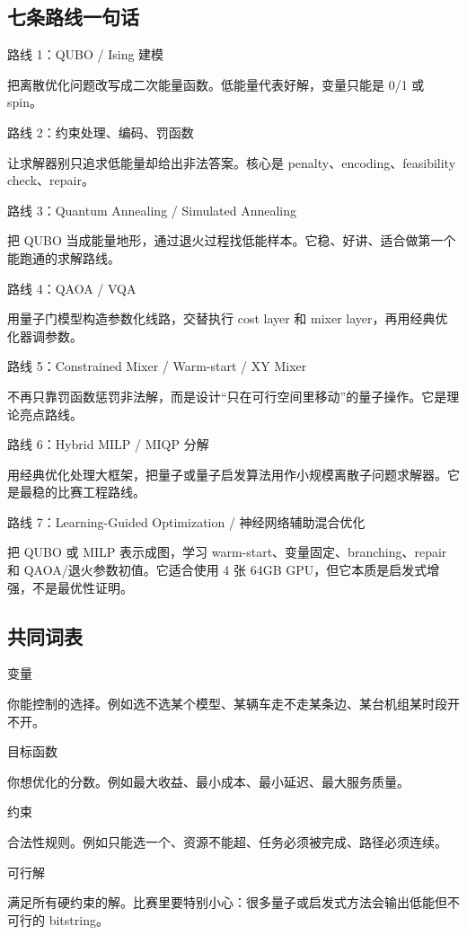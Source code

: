 \documentclass[UTF8,12pt,a4paper]{ctexart}
\begin{document}
\subsection*{七条路线一句话}

路线 1：QUBO / Ising 建模

把离散优化问题改写成二次能量函数。低能量代表好解，变量只能是 0/1 或 spin。

路线 2：约束处理、编码、罚函数

让求解器别只追求低能量却给出非法答案。核心是 penalty、encoding、feasibility check、repair。

路线 3：Quantum Annealing / Simulated Annealing

把 QUBO 当成能量地形，通过退火过程找低能样本。它稳、好讲、适合做第一个能跑通的求解路线。

路线 4：QAOA / VQA

用量子门模型构造参数化线路，交替执行 cost layer 和 mixer layer，再用经典优化器调参数。

路线 5：Constrained Mixer / Warm-start / XY Mixer

不再只靠罚函数惩罚非法解，而是设计“只在可行空间里移动”的量子操作。它是理论亮点路线。

路线 6：Hybrid MILP / MIQP 分解

用经典优化处理大框架，把量子或量子启发算法用作小规模离散子问题求解器。它是最稳的比赛工程路线。

路线 7：Learning-Guided Optimization / 神经网络辅助混合优化

把 QUBO 或 MILP 表示成图，学习 warm-start、变量固定、branching、repair 和 QAOA/退火参数初值。它适合使用 4 张 64GB GPU，但它本质是启发式增强，不是最优性证明。

\subsection*{共同词表}

变量

你能控制的选择。例如选不选某个模型、某辆车走不走某条边、某台机组某时段开不开。

目标函数

你想优化的分数。例如最大收益、最小成本、最小延迟、最大服务质量。

约束

合法性规则。例如只能选一个、资源不能超、任务必须被完成、路径必须连续。

可行解

满足所有硬约束的解。比赛里要特别小心：很多量子或启发式方法会输出低能但不可行的 bitstring。
\end{document}
